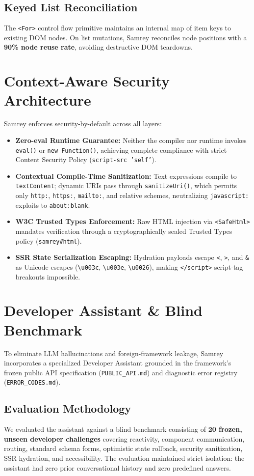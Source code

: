 \documentclass[10pt,journal,compsoc]{IEEEtran}
\begin{document}
\subsection{Keyed List Reconciliation}
The \texttt{<For>} control flow primitive maintains an internal map of item keys to existing DOM nodes. On list mutations, Samrey reconciles node positions with a \textbf{90\% node reuse rate}, avoiding destructive DOM teardowns.

\section{Context-Aware Security Architecture}
Samrey enforces security-by-default across all layers:
\begin{itemize}
    \item \textbf{Zero-eval Runtime Guarantee:} Neither the compiler nor runtime invokes \texttt{eval()} or \texttt{new Function()}, achieving complete compliance with strict Content Security Policy (\texttt{script-src 'self'}).
    \item \textbf{Contextual Compile-Time Sanitization:} Text expressions compile to \texttt{textContent}; dynamic URIs pass through \texttt{sanitizeUri()}, which permits only \texttt{http:}, \texttt{https:}, \texttt{mailto:}, and relative schemes, neutralizing \texttt{javascript:} exploits to \texttt{about:blank}.
    \item \textbf{W3C Trusted Types Enforcement:} Raw HTML injection via \texttt{<SafeHtml>} mandates verification through a cryptographically sealed Trusted Types policy (\texttt{samrey\#html}).
    \item \textbf{SSR State Serialization Escaping:} Hydration payloads escape \texttt{<}, \texttt{>}, and \texttt{\&} as Unicode escapes (\texttt{\textbackslash u003c}, \texttt{\textbackslash u003e}, \texttt{\textbackslash u0026}), making \texttt{</script>} script-tag breakouts impossible.
\end{itemize}

\section{Developer Assistant & Blind Benchmark}
To eliminate LLM hallucinations and foreign-framework leakage, Samrey incorporates a specialized Developer Assistant grounded in the framework's frozen public API specification (\texttt{PUBLIC\_API.md}) and diagnostic error registry (\texttt{ERROR\_CODES.md}).

\subsection{Evaluation Methodology}
We evaluated the assistant against a blind benchmark consisting of \textbf{20 frozen, unseen developer challenges} covering reactivity, component communication, routing, standard schema forms, optimistic state rollback, security sanitization, SSR hydration, and accessibility. The evaluation maintained strict isolation: the assistant had zero prior conversational history and zero predefined answers.
\end{document}
